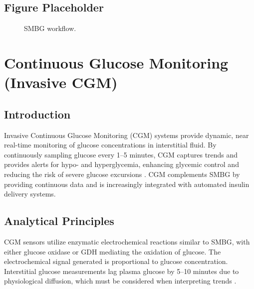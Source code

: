 \documentclass[12pt,a4paper]{article}
\begin{document}
\subsection{Figure Placeholder}
\begin{figure}[h!]
\centering
{}
\caption{SMBG workflow.}
\label{fig:smbg_workflow}
\end{figure}

\section{Continuous Glucose Monitoring (Invasive CGM)}

\subsection{Introduction}
Invasive Continuous Glucose Monitoring (CGM) systems provide dynamic, near real-time monitoring of glucose concentrations in interstitial fluid. By continuously sampling glucose every 1–5 minutes, CGM captures trends and provides alerts for hypo- and hyperglycemia, enhancing glycemic control and reducing the risk of severe glucose excursions \cite{CGM_Ambulatory_Review_2024, CGM_Routine_Care_2024}. CGM complements SMBG by providing continuous data and is increasingly integrated with automated insulin delivery systems.

\subsection{Analytical Principles}
CGM sensors utilize enzymatic electrochemical reactions similar to SMBG, with either glucose oxidase or GDH mediating the oxidation of glucose. The electrochemical signal generated is proportional to glucose concentration. Interstitial glucose measurements lag plasma glucose by 5–10 minutes due to physiological diffusion, which must be considered when interpreting trends \cite{CGM_ICU_Accuracy_2024}.
\end{document}
